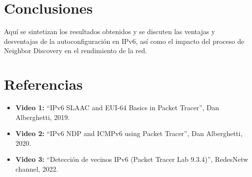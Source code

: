 \documentclass[a4paper,12pt]{article}
\begin{document}
\section{Conclusiones}
Aquí se sintetizan los resultados obtenidos y se discuten las ventajas y desventajas de la autoconfiguración en IPv6, así como el impacto del proceso de Neighbor Discovery en el rendimiento de la red.

\section{Referencias}
\begin{itemize}
  \item \textbf{Video 1:} “IPv6 SLAAC and EUI-64 Basics in Packet Tracer”, Dan Alberghetti, 2019.
  \item \textbf{Video 2:} “IPv6 NDP and ICMPv6 using Packet Tracer”, Dan Alberghetti, 2020.
  \item \textbf{Video 3:} “Detección de vecinos IPv6 (Packet Tracer Lab 9.3.4)”, RedesNetw channel, 2022.
\end{itemize}
\end{document}
